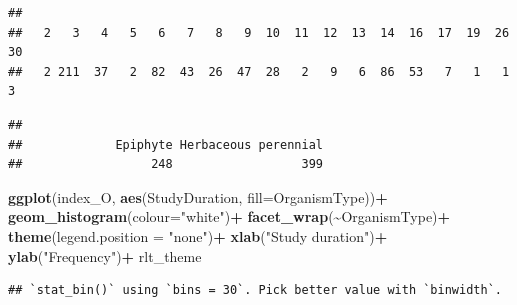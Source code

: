 \documentclass[
]{book}
\newenvironment{Shaded}{\begin{snugshade}}{\end{snugshade}}
\newcommand{\AttributeTok}[1]{\textcolor[rgb]{0.13,0.29,0.53}{#1}}
\newcommand{\FunctionTok}[1]{\textcolor[rgb]{0.13,0.29,0.53}{\textbf{#1}}}
\newcommand{\NormalTok}[1]{#1}
\newcommand{\OtherTok}[1]{\textcolor[rgb]{0.56,0.35,0.01}{#1}}
\newcommand{\SpecialCharTok}[1]{\textcolor[rgb]{0.81,0.36,0.00}{\textbf{#1}}}
\newcommand{\StringTok}[1]{\textcolor[rgb]{0.31,0.60,0.02}{#1}}
\theoremstyle{definition}
\theoremstyle{definition}
\theoremstyle{definition}
\theoremstyle{definition}
\theoremstyle{remark}
\begin{document}
\begin{Shaded}
\end{Shaded}

\begin{verbatim}
## 
##   2   3   4   5   6   7   8   9  10  11  12  13  14  16  17  19  26  30 
##   2 211  37   2  82  43  26  47  28   2   9   6  86  53   7   1   1   3
\end{verbatim}

\begin{Shaded}
\end{Shaded}

\begin{verbatim}
## 
##             Epiphyte Herbaceous perennial 
##                  248                  399
\end{verbatim}

\begin{Shaded}
\begin{Highlighting}[]
\FunctionTok{ggplot}\NormalTok{(index\_O, }\FunctionTok{aes}\NormalTok{(StudyDuration, }\AttributeTok{fill=}\NormalTok{OrganismType))}\SpecialCharTok{+}
         \FunctionTok{geom\_histogram}\NormalTok{(}\AttributeTok{colour=}\StringTok{"white"}\NormalTok{)}\SpecialCharTok{+}
  \FunctionTok{facet\_wrap}\NormalTok{(}\SpecialCharTok{\textasciitilde{}}\NormalTok{OrganismType)}\SpecialCharTok{+}
  \FunctionTok{theme}\NormalTok{(}\AttributeTok{legend.position =} \StringTok{"none"}\NormalTok{)}\SpecialCharTok{+}
  \FunctionTok{xlab}\NormalTok{(}\StringTok{"Study duration"}\NormalTok{)}\SpecialCharTok{+}
  \FunctionTok{ylab}\NormalTok{(}\StringTok{"Frequency"}\NormalTok{)}\SpecialCharTok{+}
\NormalTok{  rlt\_theme}
\end{Highlighting}
\end{Shaded}

\begin{verbatim}
## `stat_bin()` using `bins = 30`. Pick better value with `binwidth`.
\end{verbatim}
\end{document}
